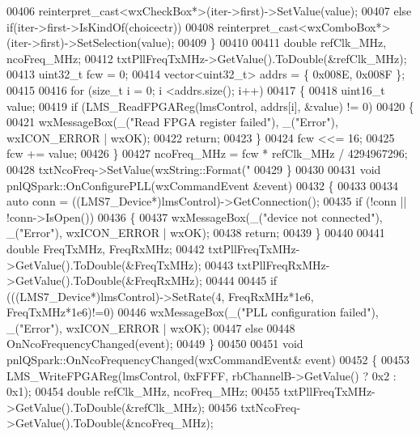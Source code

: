 \begin{DoxyCode}
{{00406             reinterpret\_cast<wxCheckBox*>(iter->first)->SetValue(value);
00407         \textcolor{keywordflow}{else} \textcolor{keywordflow}{if}(iter->first->IsKindOf(choicectr))
00408             reinterpret\_cast<wxComboBox*>(iter->first)->SetSelection(value);
00409     \}
00410 
00411     \textcolor{keywordtype}{double} refClk\_MHz, ncoFreq\_MHz;
00412     txtPllFreqTxMHz->GetValue().ToDouble(&refClk\_MHz);
00413     uint32\_t fcw = 0;
00414     vector<uint32\_t> addrs = \{ 0x008E, 0x008F \};
00415 
00416     \textcolor{keywordflow}{for} (\textcolor{keywordtype}{size\_t} i = 0; i <addrs.size(); i++)
00417     \{
00418         uint16\_t value;
00419         \textcolor{keywordflow}{if} (LMS_ReadFPGAReg(lmsControl, addrs[i], &value) != 0)
00420         \{
00421             wxMessageBox(\_(\textcolor{stringliteral}{"Read FPGA register failed"}), \_(\textcolor{stringliteral}{"Error"}), wxICON\_ERROR | wxOK);
00422             \textcolor{keywordflow}{return};
00423         \}
00424         fcw <<= 16;
00425         fcw += value;
00426     \}
00427     ncoFreq\_MHz = fcw * refClk\_MHz / 4294967296;
00428     txtNcoFreq->SetValue(wxString::Format(\textcolor{stringliteral}{"%
00429 \}
00430 
00431 \textcolor{keywordtype}{void} pnlQSpark::OnConfigurePLL(wxCommandEvent &event)
00432 \{
00433 
00434     \textcolor{keyword}{auto} conn = ((LMS7_Device*)lmsControl)->GetConnection();
00435     \textcolor{keywordflow}{if} (!conn || !conn->IsOpen())
00436     \{
00437         wxMessageBox(\_(\textcolor{stringliteral}{"device not connected"}), \_(\textcolor{stringliteral}{"Error"}), wxICON\_ERROR | wxOK);
00438         \textcolor{keywordflow}{return};
00439     \}
00440 
00441     \textcolor{keywordtype}{double} FreqTxMHz, FreqRxMHz;
00442     txtPllFreqTxMHz->GetValue().ToDouble(&FreqTxMHz);
00443     txtPllFreqRxMHz->GetValue().ToDouble(&FreqRxMHz);
00444 
00445     \textcolor{keywordflow}{if} (((LMS7_Device*)lmsControl)->SetRate(4, FreqRxMHz*1e6, FreqTxMHz*1e6)!=0)
00446         wxMessageBox(\_(\textcolor{stringliteral}{"PLL configuration failed"}), \_(\textcolor{stringliteral}{"Error"}), wxICON\_ERROR | wxOK);
00447     \textcolor{keywordflow}{else}
00448         OnNcoFrequencyChanged(event);
00449 \}
00450 
00451 \textcolor{keywordtype}{void} pnlQSpark::OnNcoFrequencyChanged(wxCommandEvent& event)
00452 \{
00453     LMS_WriteFPGAReg(lmsControl, 0xFFFF, rbChannelB->GetValue() ? 0x2 : 0x1);
00454     \textcolor{keywordtype}{double} refClk\_MHz, ncoFreq\_MHz;
00455     txtPllFreqTxMHz->GetValue().ToDouble(&refClk\_MHz);
00456     txtNcoFreq->GetValue().ToDouble(&ncoFreq\_MHz);
}}}
\end{DoxyCode}
